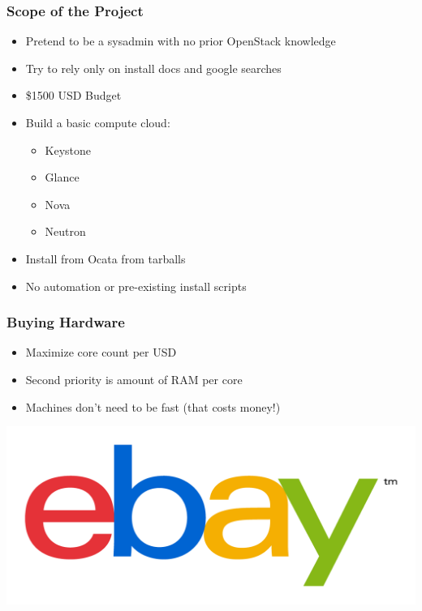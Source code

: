 \documentclass[aspectratio=169,11pt,hyperref={colorlinks=true}]{beamer}
\begin{document}
\begin{frame}
\frametitle{Scope of the Project}
    \begin{itemize}
        \item Pretend to be a sysadmin with no prior OpenStack knowledge
        \item Try to rely only on install docs and google searches
        \item \$1500 USD Budget
        \item Build a basic compute cloud:
        \begin{itemize}
            \item Keystone
            \item Glance
            \item Nova
            \item Neutron
        \end{itemize}
        \item Install from Ocata from tarballs
        \item No automation or pre-existing install scripts
    \end{itemize}
\end{frame}

\begin{frame}
\frametitle{Buying Hardware}
    \begin{itemize}
        \item Maximize core count per USD
        \item Second priority is amount of RAM per core
        \item Machines don't need to be fast (that costs money!)
    \end{itemize}
\end{frame}

\begin{frame}
    \includegraphics[width=\textwidth]{EBay_logo.png}
\end{frame}
\end{document}
